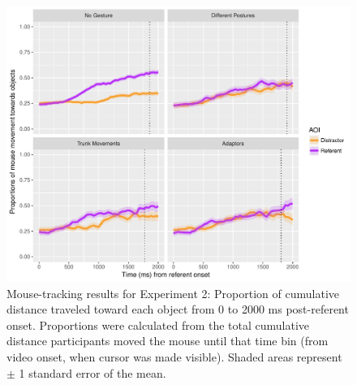 \documentclass[a4paper,man,natbib]{apa6}
\begin{document}
\begin{figure}[Ht]
  \centering
	\includegraphics[width=\linewidth]{./img/e7_mouset.pdf}
  \caption{Mouse-tracking results for Experiment 2: Proportion of cumulative distance traveled toward each object from 0 to 2000 ms post-referent onset. Proportions were calculated from the total cumulative distance participants moved the mouse until that time bin (from video onset, when cursor was made visible). Shaded areas represent $\pm$ 1 standard error of the mean.}
  \label{fig:v1_mouse}
\end{figure}
\end{document}
